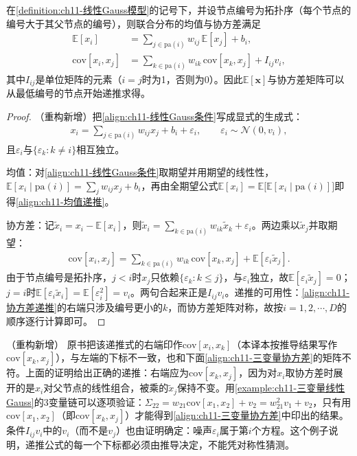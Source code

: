 \documentclass[../../main.tex]{subfiles}
\begin{document}
\begin{proposition}[线性Gauss模型的矩递推]\label{proposition:ch11-线性Gauss矩}
在\cref{definition:ch11-线性Gauss模型}的记号下，并设节点编号为拓扑序（每个节点的编号大于其父节点的编号），则联合分布的均值与协方差满足
\begin{align}
  \mathbb{E}[x_i] &= \sum_{j\in\mathrm{pa}(i)}w_{ij}\,\mathbb{E}[x_j]+b_i,
  \label{align:ch11-均值递推}\\
  \mathrm{cov}[x_i,x_j] &= \sum_{k\in\mathrm{pa}(i)}w_{ik}\,\mathrm{cov}[x_k,x_j]+I_{ij}v_i,
  \label{align:ch11-协方差递推}
\end{align}
其中$I_{ij}$是单位矩阵的元素（$i=j$时为1，否则为0）。因此$\mathbb{E}[\mathbf{x}]$与协方差矩阵可以从最低编号的节点开始递推求得。
\end{proposition}

\begin{proof}
（重构新增）把\eqref{align:ch11-线性Gauss条件}写成显式的生成式：
\begin{align}
  x_i = \sum_{j\in\mathrm{pa}(i)}w_{ij}x_j+b_i+\varepsilon_i,\qquad \varepsilon_i\sim\mathcal{N}(0,v_i),
\end{align}
且$\varepsilon_i$与$\{\varepsilon_k:k\neq i\}$相互独立。

均值：对\eqref{align:ch11-线性Gauss条件}取期望并用期望的线性性，$\mathbb{E}[x_i\mid \mathrm{pa}(i)]=\sum_j w_{ij}x_j+b_i$，再由全期望公式$\mathbb{E}[x_i]=\mathbb{E}\bigl[\mathbb{E}[x_i\mid\mathrm{pa}(i)]\bigr]$即得\eqref{align:ch11-均值递推}。

协方差：记$\tilde{x}_i=x_i-\mathbb{E}[x_i]$，则$\tilde{x}_i=\sum_{k\in\mathrm{pa}(i)}w_{ik}\tilde{x}_k+\varepsilon_i$。两边乘以$\tilde{x}_j$并取期望：
\begin{align}
  \mathrm{cov}[x_i,x_j] = \sum_{k\in\mathrm{pa}(i)}w_{ik}\,\mathrm{cov}[x_k,x_j]+\mathbb{E}[\varepsilon_i\tilde{x}_j].
\end{align}
由于节点编号是拓扑序，$j<i$时$x_j$只依赖$\{\varepsilon_k:k\leqslant j\}$，与$\varepsilon_i$独立，故$\mathbb{E}[\varepsilon_i\tilde{x}_j]=0$；$j=i$时$\mathbb{E}[\varepsilon_i\tilde{x}_i]=\mathbb{E}[\varepsilon_i^{2}]=v_i$。两句合起来正是$I_{ij}v_i$。递推的可用性：\eqref{align:ch11-协方差递推}的右端只涉及编号更小的$k$，而协方差矩阵对称，故按$i=1,2,\cdots,D$的顺序逐行计算即可。
\end{proof}

\begin{remark}（重构新增）
原书把该递推式的右端印作$\mathrm{cov}[x_i,x_k]$（本译本按推导结果写作$\mathrm{cov}[x_k,x_j]$），与左端的下标不一致，也和下面\eqref{align:ch11-三变量协方差}的矩阵不符。上面的证明给出正确的递推：右端应为$\mathrm{cov}[x_k,x_j]$，因为对$x_i$取协方差时展开的是$x_i$对父节点的线性组合，被乘的$\tilde{x}_j$保持不变。用\cref{example:ch11-三变量线性Gauss}的$3$变量链可以逐项验证：$\Sigma_{22}=w_{21}\mathrm{cov}[x_1,x_2]+v_2=w_{21}^{2}v_1+v_2$，只有用$\mathrm{cov}[x_1,x_2]$（即$\mathrm{cov}[x_k,x_j]$）才能得到\eqref{align:ch11-三变量协方差}中印出的结果。条件$I_{ij}v_i$中的$v_i$（而不是$v_j$）也由证明确定：噪声$\varepsilon_i$属于第$i$个方程。这个例子说明，递推公式的每一个下标都必须由推导决定，不能凭对称性猜测。
\end{remark}
\end{document}
